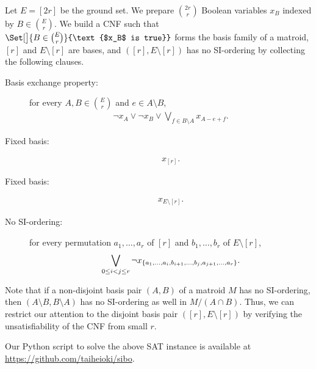 \documentclass{article}
\DeclarePairedDelimiter{\set}{\{}{\}}
\theoremstyle{definition}
\begin{document}
Let $E = [2r]$ be the ground set.
We prepare $\binom{2r}{r}$ Boolean variables $x_B$ indexed by $B \in \binom{E}{r}$.
We build a CNF such that $\Set[\big]{B \in \binom{E}{r}}{\text{$x_B$ is true}}$ forms the basis family of a matroid, $[r]$ and $E \setminus [r]$ are bases, and $([r], E \setminus [r])$ has no SI-ordering by collecting the following clauses.
\begin{description}
    \item[Basis exchange property:] for every $A, B \in \binom{E}{r}$ and $e \in A \setminus B$,
\begin{align}
        \neg x_A \vee \neg x_B \vee 
        \bigvee_{f \in B \setminus A} x_{A - e + f}.
    \end{align}

    \item[Fixed basis:]
\begin{align}
        x_{[r]}.
    \end{align}

    \item[Fixed basis:]
\begin{align}
        x_{E \setminus [r]}.
    \end{align}
    
    \item[No SI-ordering:] for every permutation $a_1, \dotsc, a_r$ of $[r]$ and $b_1, \dotsc, b_r$ of $E \setminus [r]$,
\begin{align}
        \bigvee_{0 \le i < j \le r} 
          \neg x_{\set{a_1, \dotsc, a_i, b_{i+1}, \dotsc, b_j, a_{j+1}, \dotsc, a_r}}.
    \end{align}
\end{description}
Note that if a non-disjoint basis pair $(A, B)$ of a matroid $M$ has no SI-ordering, then $(A \setminus B, B \setminus A)$ has no SI-ordering as well in $M/(A\cap B)$.
Thus, we can restrict our attention to the disjoint basis pair $([r], E \setminus [r])$ by verifying the unsatisfiability of the CNF from small $r$.

Our Python script to solve the above SAT instance is available at \url{https://github.com/taiheioki/sibo}.
\end{document}
